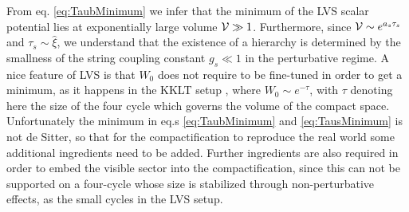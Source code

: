 \documentclass[12pt,a4paper]{book}
\newcommand{\V}{{\cal{V}}}
\begin{document}
From eq. \eqref{eq:TaubMinimum} we infer that the minimum of the LVS scalar potential lies at exponentially large volume $\V \gg 1$. Furthermore, since $\V \sim e^{a_s \tau_s}$ and $\tau_s \sim \hat{\xi}$, we understand that the existence of a hierarchy is determined by the smallness of the string coupling constant $g_s \ll 1$ in the perturbative regime. A nice feature of LVS is that $W_0$ does not require to be fine-tuned in order to get a minimum, as it happens in the KKLT setup \cite{Kachru:2003aw}, where $W_0 \sim e^{- \tau}$, with $\tau$ denoting here the size of the four cycle which governs the volume of the compact space. Unfortunately the minimum in eq.s \eqref{eq:TaubMinimum} and \eqref{eq:TausMinimum} is not de Sitter, so that for the compactification to reproduce the real world some additional ingredients need to be added. Further ingredients are also required in order to embed the visible sector into the compactification, since this can not be supported on a four-cycle whose size is stabilized through non-perturbative effects, as the small cycles in the LVS setup.\\
\end{document}
